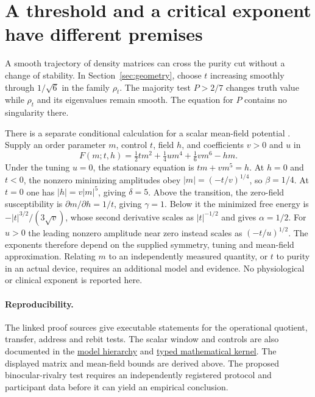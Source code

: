 \section{A threshold and a critical exponent have different premises}
A smooth trajectory of density matrices can cross the purity cut without a change of stability. In Section~\ref{sec:geometry}, choose $t$ increasing smoothly through $1/\sqrt6$ in the family $\rho_t$. The majority test $P>2/7$ changes truth value while $\rho_t$ and its eigenvalues remain smooth. The equation for $P$ contains no singularity there.

There is a separate conditional calculation for a scalar mean-field potential \citep{griffiths1970,lawrie1984}. Supply an order parameter $m$, control $t$, field $h$, and coefficients $v>0$ and $u$ in
\[
 F(m;t,h)=\tfrac12 t m^2+\tfrac14 u m^4+\tfrac16 v m^6-hm .
\]
Under the tuning $u=0$, the stationary equation is $tm+vm^5=h$. At $h=0$ and $t<0$, the nonzero minimizing amplitudes obey $|m|=(-t/v)^{1/4}$, so $\beta=1/4$. At $t=0$ one has $|h|=v|m|^5$, giving $\delta=5$. Above the transition, the zero-field susceptibility is $\partial m/\partial h=1/t$, giving $\gamma=1$. Below it the minimized free energy is $-|t|^{3/2}/(3\sqrt v)$, whose second derivative scales as $|t|^{-1/2}$ and gives $\alpha=1/2$. For $u>0$ the leading nonzero amplitude near zero instead scales as $(-t/u)^{1/2}$. The exponents therefore depend on the supplied symmetry, tuning and mean-field approximation. Relating $m$ to an independently measured quantity, or $t$ to purity in an actual device, requires an additional model and evidence. No physiological or clinical exponent is reported here.

\paragraph{Reproducibility.}
The linked proof sources give executable statements for the operational quotient, transfer, address and rebit tests. The scalar window and controls are also documented in the \href{https://holon.sh/docs/consciousness/hierarchy/interiority-hierarchy}{model hierarchy} and \href{https://holon.sh/docs/reference/mathematical-kernel}{typed mathematical kernel}. The displayed matrix and mean-field bounds are derived above. The proposed binocular-rivalry test requires an independently registered protocol and participant data before it can yield an empirical conclusion.
